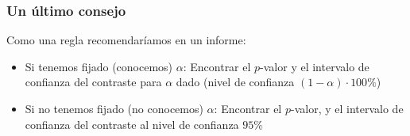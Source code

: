 \documentclass[12pt,t]{beamer}\usepackage[]{graphicx}\usepackage[]{color}
\renewcommand{\emph}[1]{{\color{red}#1}}
\theoremstyle{plain}
\theoremstyle{definition}
\begin{document}
\begin{frame}
\frametitle{Un último consejo }

Como una regla recomendaríamos en un informe:
\medskip

\begin{itemize}
\item \emph{Si tenemos fijado (conocemos)  $\alpha$:} Encontrar el $p$-valor y el intervalo de confianza del contraste para $\alpha$ dado    (nivel   de confianza $(1-\alpha)\cdot 100\%$)
\medskip

\item \emph{Si no tenemos fijado (no conocemos) $\alpha$:} Encontrar el $p$-valor, y el intervalo de confianza del contraste al nivel  de confianza  $95\%$

\end{itemize}


\end{frame}
\end{document}
